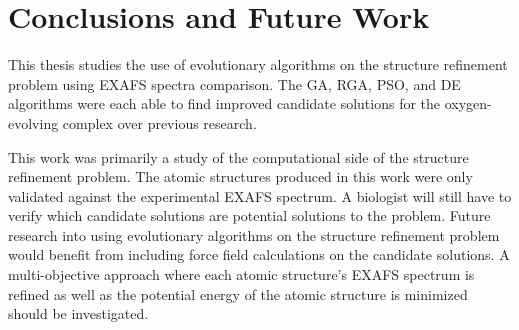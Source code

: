 \chapter{Conclusions and Future Work}

This thesis studies the use of evolutionary algorithms on the structure refinement problem using EXAFS spectra comparison. The GA, RGA, PSO, and DE algorithms were each able to find improved candidate solutions for the oxygen-evolving complex over previous research.

This work was primarily a study of the computational side of the structure refinement problem. The atomic structures produced in this work were only validated against the experimental EXAFS spectrum. A biologist will still have to verify which candidate solutions are potential solutions to the problem. Future research into using evolutionary algorithms on the structure refinement problem would benefit from including force field calculations on the candidate solutions. A multi-objective approach where each atomic structure's EXAFS spectrum is refined as well as the potential energy of the atomic structure is minimized should be investigated.
